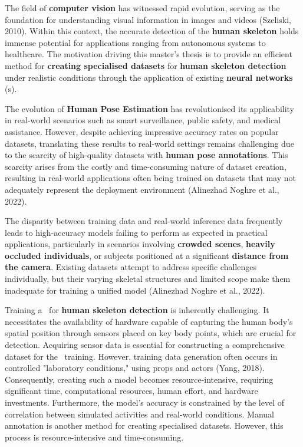 

The field of {\bf computer vision} has witnessed rapid evolution, serving as the foundation for understanding visual information in images and videos (\scc Szeliski, 2010). Within this context, the accurate detection of the {\bf human skeleton} holds immense potential for applications ranging from autonomous systems to healthcare. The motivation driving this master's thesis is to provide an efficient method for {\bf creating specialised datasets} for {\bf human skeleton detection} under realistic conditions through the application of existing {\bf neural networks} (\NN\-s).

The evolution of {\bf Human Pose Estimation} has revolutionised its applicability in real-world scenarios such as smart surveillance, public safety, and medical assistance. However, despite achieving impressive accuracy rates on popular datasets, translating these results to real-world settings remains challenging due to the scarcity of high-quality datasets with {\bf human pose annotations}. This scarcity arises from the costly and time-consuming nature of dataset creation, resulting in real-world applications often being trained on datasets that may not adequately represent the deployment environment (\scc Alinezhad Noghre et al., 2022).

The disparity between training data and real-world inference data frequently leads to high-accuracy models failing to perform as expected in practical applications, particularly in scenarios involving {\bf crowded scenes}, {\bf heavily occluded individuals}, or subjects positioned at a significant {\bf distance from the camera}. Existing datasets attempt to address specific challenges individually, but their varying skeletal structures and limited scope make them inadequate for training a unified model (\scc Alinezhad Noghre et al., 2022).

Training a \NN\ for {\bf human skeleton detection} is inherently challenging. It necessitates the availability of hardware capable of capturing the human body's spatial position through sensors placed on key body points, which are crucial for detection. Acquiring sensor data is essential for constructing a comprehensive dataset for the \NN\ training. However, training data generation often occurs in controlled "laboratory conditions," using props and actors (\scc Yang, 2018). Consequently, creating such a model becomes resource-intensive, requiring significant time, computational resources, human effort, and hardware investments.
Furthermore, the model's accuracy is constrained by the level of correlation between simulated activities and real-world conditions. Manual annotation is another method for creating specialised datasets. However, this process is resource-intensive and time-consuming.

